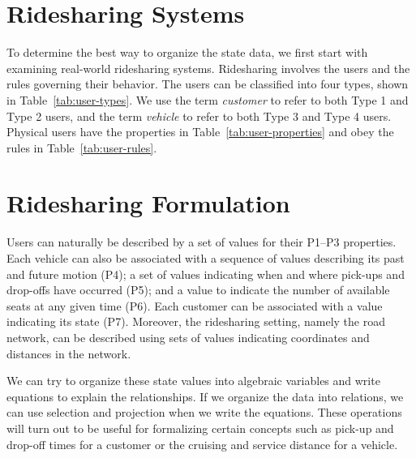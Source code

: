 \section{Ridesharing Systems}
\label{ch:1:sec:ridesharing-systems}
To determine the best way to organize the state data, we first start with
examining real-world ridesharing systems.  Ridesharing involves the
users and the rules governing their behavior. The users can be
classified into four types, shown in Table~\ref{tab:user-types}.  We use the
term \emph{customer} to refer to both Type 1 and Type 2 users, and the term
\emph{vehicle} to refer to both Type 3 and Type 4 users.  Physical users have
the properties in Table~\ref{tab:user-properties} and obey the rules in
Table~\ref{tab:user-rules}.

\section{Ridesharing Formulation}
\label{ch:1:sec:ridesharing-formulation}
Users can naturally be described by a set of values for their P1--P3
properties. Each vehicle can also be associated with a sequence of values
describing its past and future motion (P4); a set of values indicating when and
where pick-ups and drop-offs have occurred (P5); and a value to indicate the
number of available seats at any given time (P6). Each customer can be
associated with a value indicating its state (P7). Moreover, the ridesharing
setting, namely the road network, can be described using sets of values
indicating coordinates and distances in the network.

We can try to organize these state values into algebraic variables and write
equations to explain the relationships. If we organize the data into
relations, we can use selection and projection when we write the
equations. These operations will turn out to be useful for formalizing certain
concepts such as pick-up and drop-off times for a customer or the cruising and
service distance for a vehicle.

